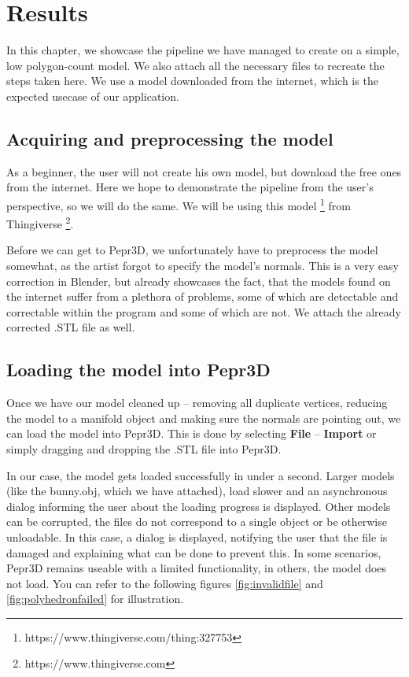 \chapter{Results}

In this chapter, we showcase the pipeline we have managed to create on a simple, low polygon-count model. We also attach all the necessary files to recreate the steps taken here. We use a model downloaded from the internet, which is the expected usecase of our application.

\section{Acquiring and preprocessing the model}

As a beginner, the user will not create his own model, but download the free ones from the internet. Here we hope to demonstrate the pipeline from the user's perspective, so we will do the same. We will be using this model \footnote{https://www.thingiverse.com/thing:327753} from Thingiverse \footnote{https://www.thingiverse.com}.

Before we can get to Pepr3D, we unfortunately have to preprocess the model somewhat, as the artist forgot to specify the model's normals. This is a very easy correction in Blender, but already showcases the fact, that the models found on the internet suffer from a plethora of problems, some of which are detectable and correctable within the program and some of which are not. We attach the already corrected .STL file as well.

\section{Loading the model into Pepr3D}

Once we have our model cleaned up -- removing all duplicate vertices, reducing the model to a manifold object and making sure the normals are pointing out, we can load the model into Pepr3D. This is done by selecting \textbf{File} -- \textbf{Import} or simply dragging and dropping the .STL file into Pepr3D.

In our case, the model gets loaded successfully in under a second. Larger models (like the bunny.obj, which we have attached), load slower and an asynchronous dialog informing the user about the loading progress is displayed. Other models can be corrupted, the files do not correspond to a single object or be otherwise unloadable. In this case, a dialog is displayed, notifying the user that the file is damaged and explaining what can be done to prevent this. In some scenarios, Pepr3D remains useable with a limited functionality, in others, the model does not load. You can refer to the following figures \ref{fig:invalidfile} and \ref{fig:polyhedronfailed} for illustration.

